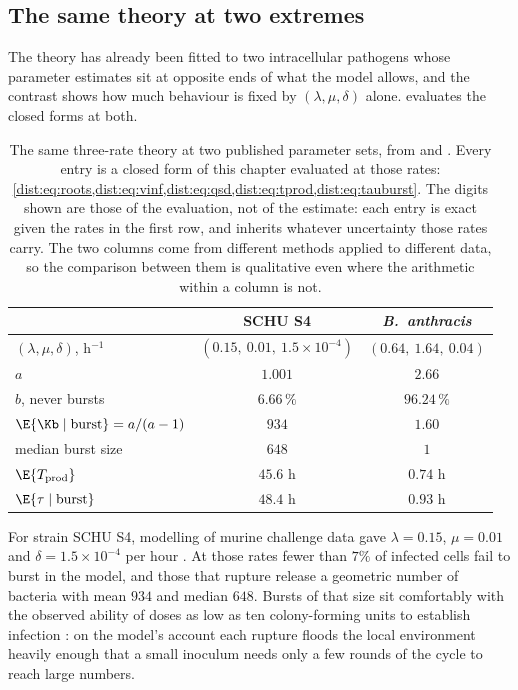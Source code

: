 \subsection{The same theory at two extremes}
\label{dist:sec:two-extremes}

The theory has already been fitted to two intracellular pathogens whose
parameter estimates sit at opposite ends of what the model allows, and the
contrast shows how much behaviour is fixed by $(\lambda,\mu,\delta)$ alone.
 evaluates the closed forms at both.

\begin{table}[tbp]
\centering
\renewcommand{\arraystretch}{1.2}
\small
\begin{tabular}{@{}lcc@{}}
\toprule
& \ft{} SCHU S4 & \textit{B.~anthracis} \\
\midrule
$(\lambda,\mu,\delta)$, h$^{-1}$ & $(0.15,\ 0.01,\ 1.5\times10^{-4})$ & $(0.64,\ 1.64,\ 0.04)$ \\
$a$ & $1.001$ & $2.66$ \\
$b$, never bursts & $6.66\,\%$ & $96.24\,\%$ \\
$\E{\Kb\mid\text{burst}}=a/(a-1)$ & $934$ & $1.60$ \\
median burst size & $648$ & $1$ \\
$\E{T_{\rm prod}}$ & $45.6$ h & $0.74$ h \\
$\E{\tau\mid\text{burst}}$ & $48.4$ h & $0.93$ h \\
\bottomrule
\end{tabular}
\caption{The same three-rate theory at two published parameter sets, from
\cite{carruthers2020stochastic} and \cite{williams2021anthrax}. Every entry is
a closed form of this chapter evaluated at those rates:
\cref{dist:eq:roots,dist:eq:vinf,dist:eq:qsd,dist:eq:tprod,dist:eq:tauburst}.
The digits shown are those of the evaluation, not of the estimate: each entry
is exact given the rates in the first row, and inherits whatever uncertainty
those rates carry. The two columns come from different methods applied to
different data, so the comparison between them is qualitative even where the
arithmetic within a column is not.}
\label{dist:tab:twoextremes}
\end{table}

For \ft{} strain SCHU S4, modelling of murine challenge data gave
$\lambda=0.15$, $\mu=0.01$ and $\delta=1.5\times10^{-4}$ per hour
\cite{carruthers2020stochastic}. At those rates fewer than $7\%$ of infected
cells fail to burst in the model, and those that rupture release a geometric
number of bacteria with mean $934$ and median $648$. Bursts of that size sit
comfortably with the observed ability of doses as low as ten colony-forming
units to establish infection \cite{oyston2004tularaemia}: on the model's
account each rupture floods the local environment heavily enough that a small
inoculum needs only a few rounds of the cycle to reach large numbers.

